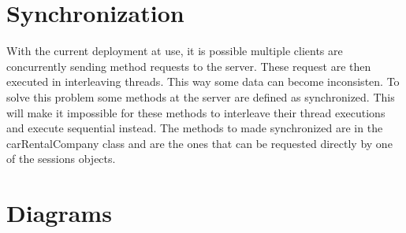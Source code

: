 \documentclass[]{article}
\begin{document}
\section{Synchronization}
With the current deployment at use, it is possible multiple clients are concurrently sending method requests to the server. These request are then executed in interleaving threads. This way some data can become inconsisten.  To solve this problem some methods at the server are defined as synchronized. This will make it impossible for these methods to interleave their thread executions and execute sequential instead. The methods to made synchronized are in the carRentalCompany class and are the ones that can be requested directly by one of the sessions objects.
\clearpage
\section{Diagrams}
\end{document}
